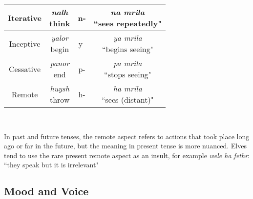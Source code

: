 \begin{table}[h!]
\begin{tabular}{c|c|c|c}
         Iterative&\makecell{\textit{nalh} \\ think}& n- & \makecell{\textit{na mrila} \\ ``sees repeatedly" }\\ \hline
         Inceptive&\makecell{\textit{yalor} \\ begin}& y- & \makecell{\textit{ya mrila} \\ ``begins  seeing" }\\ \hline
         Cessative&\makecell{\textit{panor} \\ end}& p- & \makecell{\textit{pa mrila} \\ ``stops seeing" }\\ \hline
         Remote&\makecell{\textit{huysh} \\ throw}  & h- & \makecell{\textit{ha mrila} \\``sees (distant)" \footnotemark[1]} \\
     \end{tabular}
     \\
     \medskip
     \raggedright
     {\footnotesize \footnotemark[1] \raggedleft In past and future tenses, the remote aspect refers to actions that took place long ago or far in the future, but the meaning in present tense is more nuanced. Elves tend to use the rare present remote aspect as an insult, for example \textit{wele ha fethr}: ``they speak but it is irrelevant"}
    \label{tab:aspects}
\end{table}

\medskip


\subsection*{Mood and Voice}

